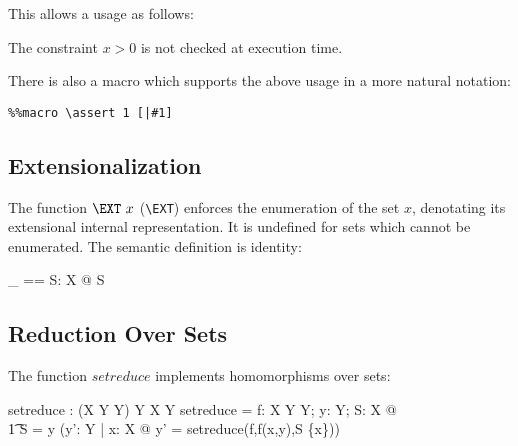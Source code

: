 \documentclass{article}
\begin{document}
This allows a usage as follows:


The constraint $x>0$ is not checked at execution time.

There is also a \Zeta{} macro which supports the
above usage in a more natural notation:

\begin{verbatim}
%%macro \assert 1 [|#1]
\end{verbatim}




\subsection{Extensionalization}

The function $\EXT~x$ (\verb:\EXT:) enforces the enumeration
of the set $x$, denotating its extensional internal representation.
It is undefined for sets which cannot be enumerated. The semantic
definition is identity:

\begin{zedgroup}
\begin{zdirectives}
\end{zdirectives}
\begin{axdef}[X]
  \EXT \_ == \lambda S: \power X @ S
\end{axdef}
\end{zedgroup}

\subsection{Reduction Over Sets}

The function $setreduce$ implements homomorphisms over sets:

\begin{axdef}[X,Y]
  setreduce : (X \cross Y \pfun Y) \cross Y \cross \power X \pfun Y
\where
  setreduce = 
     \lambda f: X \cross Y \pfun Y; y: Y; S: \power X @ \\\t1
        \IF S = \emptyset \THEN y 
        \ELSE (\mu y': Y | 
                \forall x: X @ y' = setreduce(f,f(x,y),S \setminus \{x\}))
\end{axdef}
\end{document}
